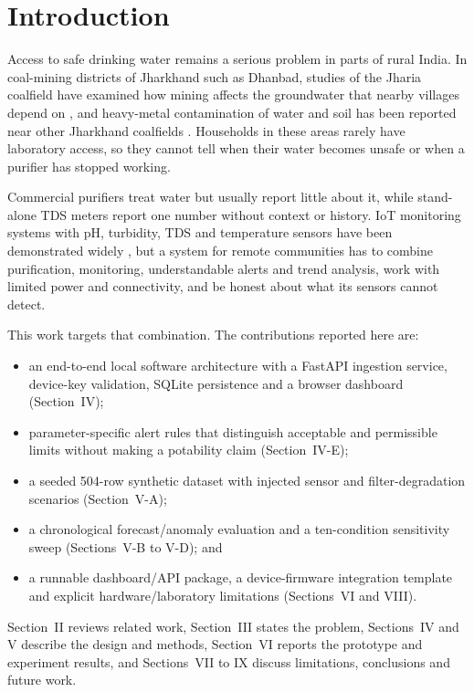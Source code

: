 \documentclass[10pt,letterpaper,twocolumn]{article}
\begin{document}
\section{Introduction}
Access to safe drinking water remains a serious problem in parts of rural India. In coal-mining districts of Jharkhand such as Dhanbad, studies of the Jharia coalfield have examined how mining affects the groundwater that nearby villages depend on \cite{panigrahy2015}, and heavy-metal contamination of water and soil has been reported near other Jharkhand coalfields \cite{singh2015}. Households in these areas rarely have laboratory access, so they cannot tell when their water becomes unsafe or when a purifier has stopped working.

Commercial purifiers treat water but usually report little about it, while stand-alone TDS meters report one number without context or history. IoT monitoring systems with pH, turbidity, TDS and temperature sensors have been demonstrated widely \cite{sung2021,salehin2023,marifah2025}, but a system for remote communities has to combine purification, monitoring, understandable alerts and trend analysis, work with limited power and connectivity, and be honest about what its sensors cannot detect.

This work targets that combination. The contributions reported here are:
\begin{itemize}
\item an end-to-end local software architecture with a FastAPI ingestion service, device-key validation, SQLite persistence and a browser dashboard (Section~IV);
\item parameter-specific alert rules that distinguish acceptable and permissible limits without making a potability claim (Section~IV-E);
\item a seeded 504-row synthetic dataset with injected sensor and filter-degradation scenarios (Section~V-A);
\item a chronological forecast/anomaly evaluation and a ten-condition sensitivity sweep (Sections~V-B to V-D); and
\item a runnable dashboard/API package, a device-firmware integration template and explicit hardware/laboratory limitations (Sections~VI and VIII).
\end{itemize}
Section~II reviews related work, Section~III states the problem, Sections~IV and V describe the design and methods, Section~VI reports the prototype and experiment results, and Sections~VII to IX discuss limitations, conclusions and future work.
\end{document}
